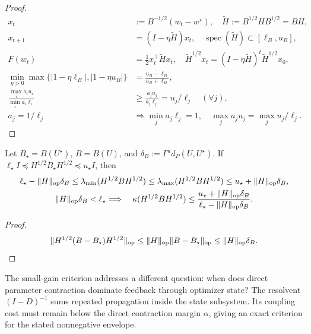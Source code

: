 \begin{proof}
\begin{align}
 x_t&:=B^{-1/2}(w_t-w^\star),\quad
 \widetilde H:=B^{1/2}HB^{1/2}=BH,\\
 x_{t+1}&=(I-\eta\widetilde H)x_t,\quad
 \operatorname{spec}(\widetilde H)\subset[\ell_B,u_B],\\
 F(w_t)&=\tfrac12x_t^\top\widetilde Hx_t,\quad
 \widetilde H^{1/2}x_t=(I-\eta\widetilde H)^t\widetilde H^{1/2}x_0,\\
 \min_{\eta>0}\max\{|1-\eta\ell_B|,|1-\eta u_B|\}
 &=\frac{u_B-\ell_B}{u_B+\ell_B},\\
 \frac{\max_i a_iu_i}{\min_i a_i\ell_i}
 &\ge\frac{a_ju_j}{a_j\ell_j}=u_j/\ell_j\quad(\forall j),\\
 a_j=1/\ell_j&\Longrightarrow\min_j a_j\ell_j=1,\quad
                                  \max_j a_ju_j=\max_j u_j/\ell_j.
\end{align}
\end{proof}
\begin{proposition}\label{prop:rigid-quadratic-error}
Let $B_\star=B(U^\star)$, $B=B(U)$, and
$\delta_B:=\Gamma^a d_P(U,U^\star)$. If
$\ell_\star I\preceq H^{1/2}B_\star H^{1/2}\preceq u_\star I$, then
\begin{gather}
 \ell_\star-\|H\|_{\mathrm{op}}\delta_B
 \le\lambda_{\min}(H^{1/2}BH^{1/2})
 \le\lambda_{\max}(H^{1/2}BH^{1/2})
 \le u_\star+\|H\|_{\mathrm{op}}\delta_B,\\
 \|H\|_{\mathrm{op}}\delta_B<\ell_\star
 \Longrightarrow\quad
 \kappa(H^{1/2}BH^{1/2})
 \le\frac{u_\star+\|H\|_{\mathrm{op}}\delta_B}
            {\ell_\star-\|H\|_{\mathrm{op}}\delta_B}.
\end{gather}
\end{proposition}
\begin{proof}
\begin{equation}
 \|H^{1/2}(B-B_\star)H^{1/2}\|_{\mathrm{op}}
 \le\|H\|_{\mathrm{op}}\|B-B_\star\|_{\mathrm{op}}\le\|H\|_{\mathrm{op}}\delta_B.
\end{equation}
\end{proof}
The small-gain criterion addresses a different question: when does direct
parameter contraction dominate feedback through optimizer state? The resolvent
$(I-D)^{-1}$ sums repeated propagation inside the state subsystem. Its coupling
cost must remain below the direct contraction margin $\alpha$, giving an exact
criterion for the stated nonnegative envelope.

